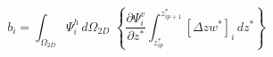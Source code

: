 \begin{equation}
b_{i}=\int\nolimits_{\Omega_{2D}}\Psi_{i}^{h}\,d\Omega_{2D}\,\,\left\{
\dfrac{\partial\Psi_{i}^{v}}{\partial z^{\ast}}\int\nolimits_{z_{ip}^{\ast}%
}^{z_{ip+1}^{\ast}}\left[  \Delta zw^{\ast}\right]  _{i}\,dz^{\ast}\right\}
\end{equation}


%
%
%
%
%
%
%
